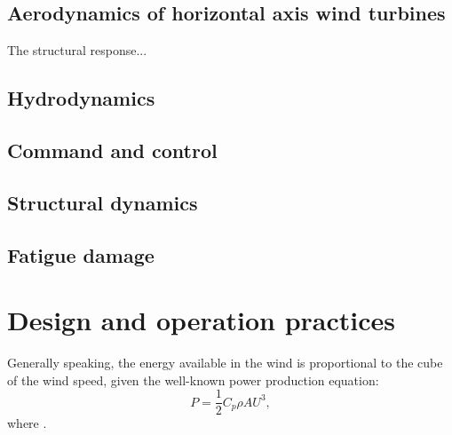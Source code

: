 \subsection{Aerodynamics of horizontal axis wind turbines}

The structural response...

\subsection{Hydrodynamics}


\subsection{Command and control}


\subsection{Structural dynamics}


\subsection{Fatigue damage}





\section{Design and operation practices} \label{sec:owt_design}

Generally speaking, the energy available in the wind is proportional to the cube of the wind speed, given the well-known power production equation:
\begin{equation}
    P = \frac12 C_p \rho A U^3,
\end{equation}  
where .


